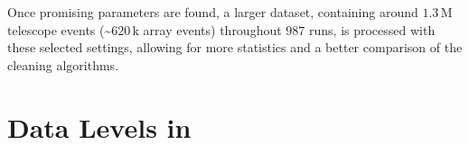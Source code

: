 Once promising parameters are found, a larger dataset, containing around \(\num{1.3}\)\,M telescope events
(\sim\(\num{620}\)\,k array events) throughout \(987\) runs, is processed with these
selected settings, allowing for more statistics and a better comparison of the cleaning algorithms.
\begin{table}
    \centering
    \caption{Simtel data properties of the \gls{corsika} simulation used for the datasets in this works
    analysis.}
    \label{tab:simtel}
\end{table}


\section{Data Levels in \ctapipe{}}
\label{sec:data-levels}

